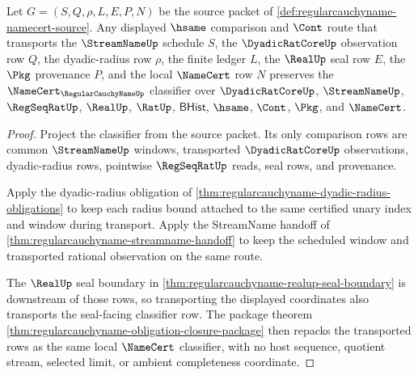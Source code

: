 \begin{theorem}
\label{thm:regularcauchyname-classifier-transport-stability}
Let $G=(S,Q,\rho,L,E,P,N)$ be the source packet of \autoref{def:regularcauchyname-namecert-source}. Any displayed $\hsame$ comparison and $\Cont$ route that transports the $\StreamNameUp$ schedule $S$, the $\DyadicRatCoreUp$ observation row $Q$, the dyadic-radius row $\rho$, the finite ledger $L$, the $\RealUp$ seal row $E$, the $\Pkg$ provenance $P$, and the local $\NameCert$ row $N$ preserves the $\NameCert_{\RegularCauchyNameUp}$ classifier over $\DyadicRatCoreUp$, $\StreamNameUp$, $\RegSeqRatUp$, $\RealUp$, $\RatUp$, $\mathsf{BHist}$, $\hsame$, $\Cont$, $\Pkg$, and $\NameCert$.
\end{theorem}
\begin{proof}
Project the classifier from the source packet. Its only comparison rows are common $\StreamNameUp$ windows, transported $\DyadicRatCoreUp$ observations, dyadic-radius rows, pointwise $\RegSeqRatUp$ reads, seal rows, and provenance.

Apply the dyadic-radius obligation of \autoref{thm:regularcauchyname-dyadic-radius-obligations} to keep each radius bound attached to the same certified unary index and window during transport. Apply the StreamName handoff of \autoref{thm:regularcauchyname-streamname-handoff} to keep the scheduled window and transported rational observation on the same route.

The $\RealUp$ seal boundary in \autoref{thm:regularcauchyname-realup-seal-boundary} is downstream of those rows, so transporting the displayed coordinates also transports the seal-facing classifier row. The package theorem \autoref{thm:regularcauchyname-obligation-closure-package} then repacks the transported rows as the same local $\NameCert$ classifier, with no host sequence, quotient stream, selected limit, or ambient completeness coordinate.
\end{proof}

